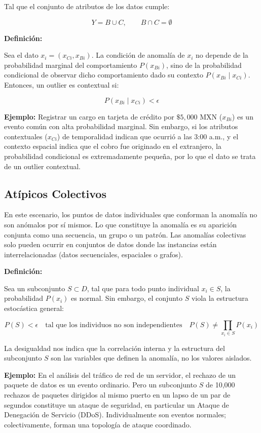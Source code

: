Tal que el conjunto de atributos de los datos cumple:

\[
Y = B \cup C,
\qquad
B \cap C = \emptyset
\]

\textbf{Definición:}

Sea el dato $x_i = (x_{Ci}, x_{Bi})$. La condición de anomalía de $x_i$ no depende de la probabilidad marginal del comportamiento $P(x_{Bi})$, sino de la probabilidad condicional de observar dicho comportamiento dado su contexto $P(x_{Bi} \mid x_{Ci})$. Entonces, un outlier es contextual si:

\[
P(x_{Bi} \mid x_{Ci}) < \epsilon
\]

\textbf{Ejemplo:} Registrar un cargo en tarjeta de crédito por $\$5{,}000$ MXN ($x_{Bi}$) es un evento común con alta probabilidad marginal. Sin embargo, si los atributos contextuales ($x_{Ci}$) de temporalidad indican que ocurrió a las 3:00 a.m., y el contexto espacial indica que el cobro fue originado en el extranjero, la probabilidad condicional es extremadamente pequeña, por lo que el dato se trata de un outlier contextual.

\subsection{Atípicos Colectivos}

En este escenario, los puntos de datos individuales que conforman la anomalía no son anómalos por sí mismos. Lo que constituye la anomalía es su aparición conjunta como una secuencia, un grupo o un patrón. Las anomalías colectivas solo pueden ocurrir en conjuntos de datos donde las instancias están interrelacionadas (datos secuenciales, espaciales o grafos).

\textbf{Definición:}

Sea un subconjunto $S \subset D$, tal que para todo punto individual $x_i \in S$, la probabilidad $P(x_i)$ es normal. Sin embargo, el conjunto $S$ viola la estructura estocástica general:

\[
P(S) < \epsilon
\quad \text{tal que los individuos no son independientes}
\quad
P(S) \neq \prod_{x_i \in S} P(x_i)
\]

La desigualdad nos indica que la correlación interna y la estructura del subconjunto $S$ son las variables que definen la anomalía, no los valores aislados.

\textbf{Ejemplo:} En el análisis del tráfico de red de un servidor, el rechazo de un paquete de datos es un evento ordinario. Pero un subconjunto $S$ de 10,000 rechazos de paquetes dirigidos al mismo puerto en un lapso de un par de segundos constituye un ataque de seguridad, en particular un Ataque de Denegación de Servicio (DDoS). Individualmente son eventos normales; colectivamente, forman una topología de ataque coordinado.

